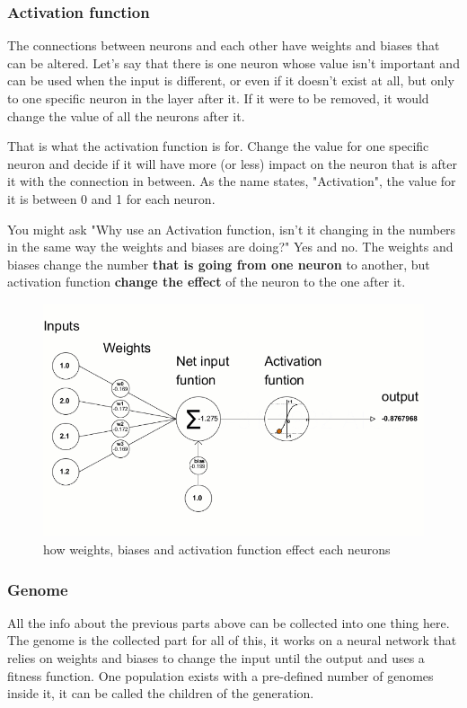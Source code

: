 \subsubsection{Activation function} \label{sec:activation-function}
The connections between neurons and each other have weights and biases that can be altered. Let's say that there is one neuron whose value isn't important and can be used when the input is different, or even if it doesn't exist at all, but only to one specific neuron in the layer after it. If it were to be removed, it would change the value of all the neurons after it.

That is what the activation function is for. Change the value for one specific neuron and decide if it will have more (or less) impact on the neuron that is after it with the connection in between. As the name states, "Activation", the value for it is between 0 and 1 for each neuron.

You might ask "Why use an Activation function, isn't it changing in the numbers in the same way the weights and biases are doing?" Yes and no. The weights and biases change the number \textbf{that is going from one neuron} to another, but activation function \textbf{change the effect} of the neuron to the one after it.

\begin{figure}[H]
	\centering
	\includegraphics[width=0.7\linewidth]{usedImages/neuronsNN}
	\caption{how weights, biases and activation function effect each neurons}
	\label{fig:neuronsnn}
\end{figure}

\subsubsection{Genome}\label{sec:genome}
All the info about the previous parts above can be collected into one thing here. The genome is the collected part for all of this, it works on a neural network that relies on weights and biases to change the input until the output and uses a fitness function. One population exists with a pre-defined number of genomes inside it, it can be called the children of the generation.



